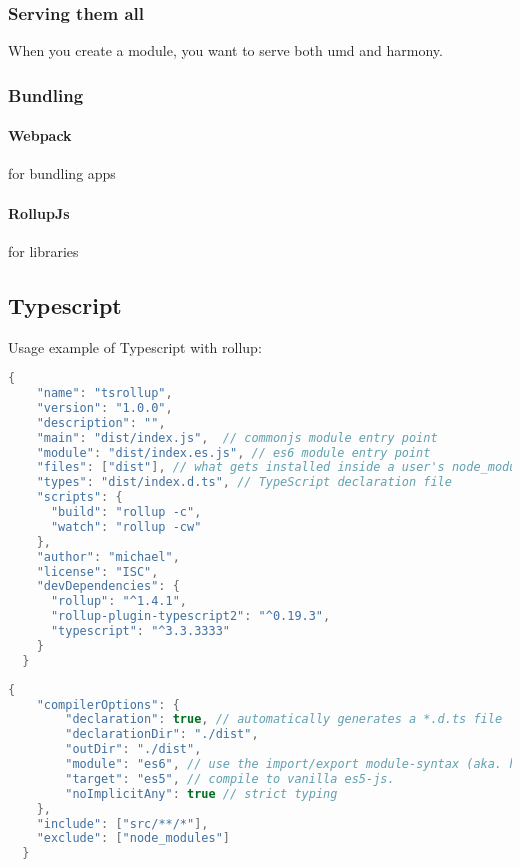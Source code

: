 \subsubsection{Serving them all}
When you create a module, you want to serve both umd and harmony.

\subsubsection{Bundling}

\paragraph{Webpack} for bundling apps

\paragraph{RollupJs} for libraries


\subsection{Typescript}
Usage example of Typescript with rollup: 

\begin{lstlisting}[language=java, caption=package.json]
  {
    "name": "tsrollup",
    "version": "1.0.0",
    "description": "",
    "main": "dist/index.js",  // commonjs module entry point
    "module": "dist/index.es.js", // es6 module entry point
    "files": ["dist"], // what gets installed inside a user's node_modules when they install your module
    "types": "dist/index.d.ts", // TypeScript declaration file
    "scripts": {
      "build": "rollup -c",
      "watch": "rollup -cw"
    },
    "author": "michael",
    "license": "ISC",
    "devDependencies": {
      "rollup": "^1.4.1",
      "rollup-plugin-typescript2": "^0.19.3",
      "typescript": "^3.3.3333"
    }
  }
\end{lstlisting}

\begin{lstlisting}[language=java, caption=tsconfig.json]
  {
    "compilerOptions": {
        "declaration": true, // automatically generates a *.d.ts file
        "declarationDir": "./dist",
        "outDir": "./dist", 
        "module": "es6", // use the import/export module-syntax (aka. harmony, as opposed to amd or commonjs)
        "target": "es5", // compile to vanilla es5-js.
        "noImplicitAny": true // strict typing
    },
    "include": ["src/**/*"],
    "exclude": ["node_modules"]
  }
\end{lstlisting}

